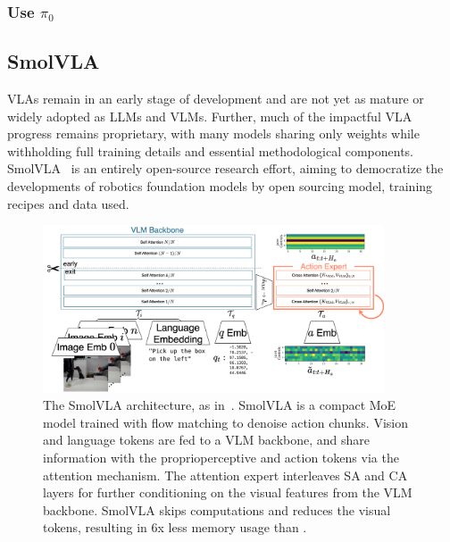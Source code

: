 \subsubsection{Use \( \pi_0 \)}

\subsection{SmolVLA}
VLAs remain in an early stage of development and are not yet as mature or widely adopted as LLMs and VLMs.
Further, much of the impactful VLA progress remains proprietary, with many models sharing only weights while withholding full training details and essential methodological components.
SmolVLA~\citep{shukorSmolVLAVisionLanguageActionModel2025} is an entirely open-source research effort, aiming to democratize the developments of robotics foundation models by open sourcing model, training recipes and data used.

\begin{figure}
    \centering
    \includegraphics[width=0.9\textwidth]{figures/ch5/ch5-smolvla.png}
    \caption{The SmolVLA architecture, as in~\citet{shukorSmolVLAVisionLanguageActionModel2025}. SmolVLA is a compact MoE model trained with flow matching to denoise action chunks. Vision and language tokens are fed to a VLM backbone, and share information with the proprioperceptive and action tokens via the attention mechanism. The attention expert interleaves SA and CA layers for further conditioning on the visual features from the VLM backbone. SmolVLA skips computations and reduces the visual tokens, resulting in 6x less memory usage than \pizero.}
    \label{fig:ch5-smolvla}
\end{figure}

